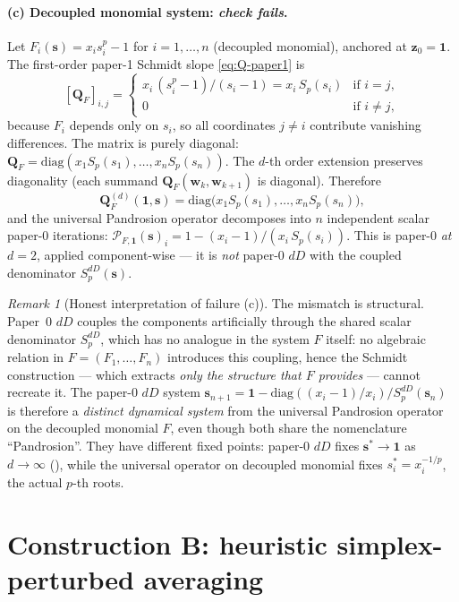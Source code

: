 \documentclass[11pt,a4paper]{article}
\theoremstyle{definition}
\theoremstyle{remark}
\newtheorem{remark}[theorem]{Remark}
\newcommand{\zb}{\mathbf{z}}
\newcommand{\wb}{\mathbf{w}}
\newcommand{\sbf}{\mathbf{s}}
\newcommand{\Qb}{\mathbf{Q}}
\newcommand{\one}{\mathbf{1}}
\begin{document}
\paragraph{(c) Decoupled monomial system: \emph{check fails}.}
Let $F_i(\sbf) = x_i s_i^p - 1$ for $i = 1, \dots, n$ (decoupled monomial),
anchored at $\zb_0 = \one$. The first-order paper-1 Schmidt slope
\eqref{eq:Q-paper1} is
\[
[\Qb_F]_{i,j} = \begin{cases} x_i\,(s_i^p - 1)/(s_i - 1) = x_i\, S_p(s_i)
                              & \text{if } i = j, \\
                              0 & \text{if } i \ne j, \end{cases}
\]
because $F_i$ depends only on $s_i$, so all coordinates $j \ne i$ contribute
vanishing differences. The matrix is purely diagonal:
$\Qb_F = \mathrm{diag}(x_1 S_p(s_1), \dots, x_n S_p(s_n))$. The
$d$-th order extension preserves diagonality (each summand
$\Qb_F(\wb_k, \wb_{k+1})$ is diagonal). Therefore
\[
\Qb_F^{(d)}(\one, \sbf) = \mathrm{diag}\big(x_1 S_p(s_1), \dots, x_n S_p(s_n)\big),
\]
and the universal Pandrosion operator decomposes into $n$ independent scalar
paper-0 iterations:
$\mathcal{P}_{F, \one}(\sbf)_i = 1 - (x_i - 1)/(x_i\, S_p(s_i))$.
This is paper-0 \emph{at $d = 2$}, applied component-wise --- it is \emph{not}
paper-0 $dD$ with the coupled denominator $S_p^{dD}(\sbf)$. \xmark

\begin{remark}[Honest interpretation of failure (c)]
The mismatch is structural. Paper~0 $dD$ couples the components artificially
through the shared scalar denominator $S_p^{dD}$, which has no analogue in
the system $F$ itself: no algebraic relation in $F = (F_1, \dots, F_n)$
introduces this coupling, hence the Schmidt construction --- which extracts
\emph{only the structure that $F$ provides} --- cannot recreate it.
The paper-0 $dD$ system $\sbf_{n+1} = \one - \mathrm{diag}((x_i - 1)/x_i)/S_p^{dD}(\sbf_n)$
is therefore a \emph{distinct dynamical system} from the universal Pandrosion
operator on the decoupled monomial $F$, even though both share the
nomenclature ``Pandrosion''. They have different fixed points: paper-0 $dD$
fixes $\sbf^* \to \one$ as $d \to \infty$ (\cite[Theorem 5]{pandrosion-dD}),
while the universal operator on decoupled monomial fixes
$s^*_i = x_i^{-1/p}$, the actual $p$-th roots.
\end{remark}

\section{Construction B: heuristic simplex-perturbed averaging}
\end{document}
